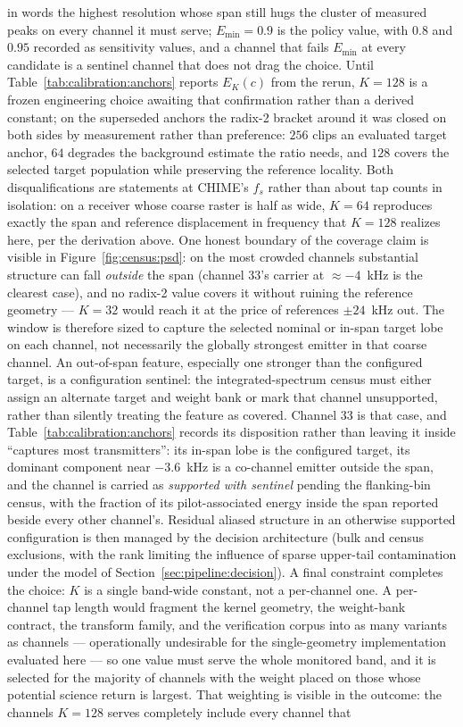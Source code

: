 \begin{enumerate}
\begin{enumerate}
in words the highest resolution whose span still hugs the cluster of measured peaks on every channel it must serve; $E_{\min} = 0.9$ is the policy value, with $0.8$ and $0.95$ recorded as sensitivity values, and a channel that fails $E_{\min}$ at every candidate is a sentinel channel that does not drag the choice. Until Table~\ref{tab:calibration:anchors} reports $E_K(c)$ from the rerun, $K = 128$ is a frozen engineering choice awaiting that confirmation rather than a derived constant; on the superseded anchors the radix-2 bracket around it was closed on both sides by measurement rather than preference: $256$ clips an evaluated target anchor, $64$ degrades the background estimate the ratio needs, and $128$ covers the selected target population while preserving the reference locality. Both disqualifications are statements at CHIME's $f_s$ rather than about tap counts in isolation: on a receiver whose coarse raster is half as wide, $K = 64$ reproduces exactly the span and reference displacement in frequency that $K = 128$ realizes here, per the derivation above. One honest boundary of the coverage claim is visible in Figure~\ref{fig:census:psd}: on the most crowded channels substantial structure can fall \emph{outside} the span (channel 33's carrier at ${\approx}{-}4$~kHz is the clearest case), and no radix-2 value covers it without ruining the reference geometry --- $K = 32$ would reach it at the price of references $\pm 24$~kHz out. The window is therefore sized to capture the selected nominal or in-span target lobe on each channel, not necessarily the globally strongest emitter in that coarse channel. An out-of-span feature, especially one stronger than the configured target, is a configuration sentinel: the integrated-spectrum census must either assign an alternate target and weight bank or mark that channel unsupported, rather than silently treating the feature as covered. Channel 33 is that case, and Table~\ref{tab:calibration:anchors} records its disposition rather than leaving it inside ``captures most transmitters'': its in-span lobe is the configured target, its dominant component near $-3.6$~kHz is a co-channel emitter outside the span, and the channel is carried as \emph{supported with sentinel} pending the flanking-bin census, with the fraction of its pilot-associated energy inside the span reported beside every other channel's. Residual aliased structure in an otherwise supported configuration is then managed by the decision architecture (bulk and census exclusions, with the rank limiting the influence of sparse upper-tail contamination under the model of Section~\ref{sec:pipeline:decision}). A final constraint completes the choice: $K$ is a single band-wide constant, not a per-channel one. A per-channel tap length would fragment the kernel geometry, the weight-bank contract, the transform family, and the verification corpus into as many variants as channels --- operationally undesirable for the single-geometry implementation evaluated here --- so one value must serve the whole monitored band, and it is selected for the majority of channels with the weight placed on those whose potential science return is largest. That weighting is visible in the outcome: the channels $K = 128$ serves completely include every channel that 
\end{enumerate}
\end{enumerate}

